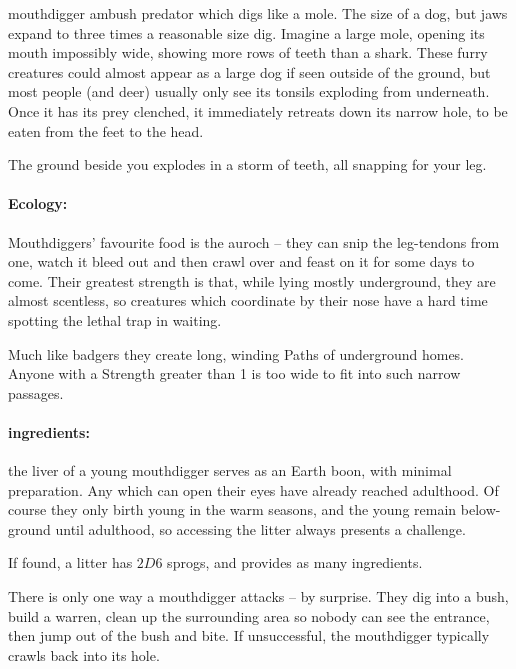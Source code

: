 \begin{multicols}{2}
\begin{itemize}
\end{itemize}

  {mouthdigger}%
  {ambush predator which digs like a mole.  The size of a dog, but jaws expand to three times a reasonable size}%
dig.
Imagine a large mole, opening its mouth impossibly wide, showing more rows of teeth than a shark.
These furry creatures could almost appear as a large dog if seen outside of the ground, but most people (and deer) usually only see its tonsils exploding from underneath.
Once it has its prey clenched, it immediately retreats down its narrow hole, to be eaten from the feet to the head.

\begin{boxtext}
  The ground beside you explodes in a storm of teeth, all snapping for your leg.
\end{boxtext}

\paragraph{Ecology:} Mouthdiggers' favourite food is the auroch -- they can snip the leg-tendons from one, watch it bleed out and then crawl over and feast on it for some days to come.
Their greatest strength is that, while lying mostly underground, they are almost scentless, so creatures which coordinate by their nose have a hard time spotting the lethal trap in waiting.

Much like badgers they create long, winding Paths of underground homes.  Anyone with a Strength greater than 1 is too wide to fit into such narrow passages.

\paragraph{\Glspl{ingredient}:}
the liver of a young mouthdigger serves as an Earth \gls{boon}, with minimal preparation.
Any which can open their eyes have already reached adulthood.
Of course they only birth young in the warm seasons, and the young remain below-ground until adulthood, so accessing the litter always presents a challenge.

If found, a litter has $2D6$ sprogs, and provides as many \glspl{ingredient}.

\showEnc
There is only one way a mouthdigger attacks -- by surprise.  They dig into a bush, build a warren, clean up the surrounding area so nobody can see the entrance, then jump out of the bush and bite.  If unsuccessful, the mouthdigger typically crawls back into its hole.


\end{multicols}
